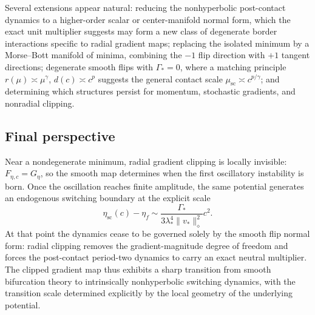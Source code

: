 Several extensions appear natural: reducing the nonhyperbolic
post-contact dynamics to a higher-order scalar or center-manifold
normal form, which the exact unit multiplier suggests may form a new
class of degenerate border interactions specific to radial gradient
maps; replacing the isolated minimum by a Morse--Bott manifold of
minima, combining the $-1$ flip direction with $+1$ tangent
directions; degenerate smooth flips with $\Gamma_*=0$, where a
matching principle $r(\mu)\asymp\mu^\gamma$, $d(c)\asymp c^p$
suggests the general contact scale
$\mu_{\mathrm{sc}}\asymp c^{p/\gamma}$; and determining which
structures persist for momentum, stochastic gradients, and nonradial
clipping.

\subsection{Final perspective}
\label{subsec:conclusion-final-perspective}

Near a nondegenerate minimum, radial gradient clipping is locally
invisible: $F_{\eta,c}=G_\eta$, so the smooth map determines when the
first oscillatory instability is born.  Once the oscillation reaches
finite amplitude, the same potential generates an endogenous switching
boundary at the explicit scale
\[
\eta_{\mathrm{sc}}(c)-\eta_f
\sim
\frac{\Gamma_*}{
3\lambda_*^4
\|v_*\|_\diamond^2
}
c^2.
\]
At that point the dynamics cease to be governed solely by the smooth
flip normal form: radial clipping removes the gradient-magnitude
degree of freedom and forces the post-contact period-two dynamics to
carry an exact neutral multiplier.  The clipped gradient map thus
exhibits a sharp transition from smooth bifurcation theory to
intrinsically nonhyperbolic switching dynamics, with the transition
scale determined explicitly by the local geometry of the underlying
potential.
